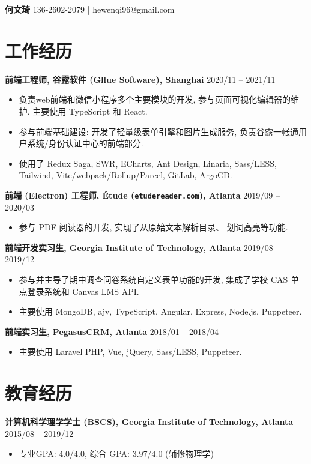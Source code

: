 \documentclass[10pt]{article}
\begin{document}
{\bf\huge 何文琦} \hfill 136-2602-2079 | hewenqi96@gmail.com

\section*{工作经历}
\textbf{前端工程师, 谷露软件 (Gllue Software), Shanghai} \hfill 2020/11 -- 2021/11
\begin{itemize}
\item 负责web前端和微信小程序多个主要模块的开发, 参与页面可视化编辑器的维护. 主要使用 TypeScript 和 React.
\item 参与前端基础建设: 开发了轻量级表单引擎和图片生成服务, 负责谷露一帐通用户系统/身份认证中心的前端部分.
\item {\small 使用了 Redux Saga, SWR, ECharts, Ant Design, Linaria, Sass/LESS, Tailwind, Vite/webpack/Rollup/Parcel, GitLab, ArgoCD.}
\end{itemize}

\vspace{0.5em}
\textbf{前端 (Electron) 工程师, Étude (\texttt{etudereader.com}), Atlanta} \hfill 2019/09 -- 2020/03
\begin{itemize}
\item 参与 PDF 阅读器的开发, 实现了从原始文本解析目录、 划词高亮等功能.
\end{itemize}

\vspace{0.5em}
\textbf{前端开发实习生, Georgia Institute of Technology, Atlanta} \hfill 2019/08 -- 2019/12
\begin{itemize}
\item 参与并主导了期中调查问卷系统自定义表单功能的开发, 集成了学校 CAS 单点登录系统和 Canvas LMS API.
\item 主要使用 MongoDB, ajv, TypeScript, Angular, Express,  Node.js, Puppeteer.
\end{itemize}

\vspace{0.5em}
\textbf{前端实习生, PegasusCRM, Atlanta} \hfill 2018/01 -- 2018/04
\begin{itemize}
\item 主要使用 Laravel PHP, Vue, jQuery, Sass/LESS, Puppeteer.
\end{itemize}


\section*{教育经历}
\textbf{计算机科学理学学士 (BSCS), Georgia Institute of Technology, Atlanta} \hfill 2015/08 -- 2019/12
\begin{itemize}
\item  专业GPA: 4.0/4.0, 综合 GPA: 3.97/4.0 (辅修物理学)
\end{itemize} 
\end{document}

